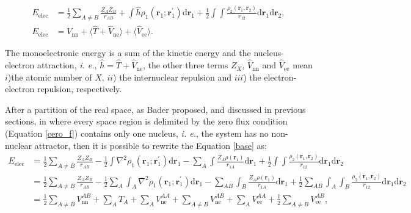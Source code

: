 \begin{align}
  E_{\mathrm{elec}} & = \frac{1}{2} \sum_{A \neq B} \frac{Z_A Z_B}{r_{AB}} 
    + \int \widehat{h} \rho_1(\mathbf{r}_1;\mathbf{r}_1^{\prime}) \mathrm{d} \mathbf{r}_1 
    + \frac{1}{2} \int \int \frac{\rho_2(\mathbf{r}_1,\mathbf{r}_2)}{r_{12}} 
    \mathrm{d} \mathbf{r}_1 \mathrm{d} \mathbf{r}_2, \label{base}\\
  E_{\mathrm{elec}} & = V_{\mathrm{nn}}
    + \langle \widehat{T} + \widehat{V}_{\mathrm{ne}} \rangle 
    + \langle \widehat{V}_{\mathrm{ee}} \rangle.
\end{align}

The monoelectronic energy is a sum of the kinetic energy and the
nucleus-electron attraction, \textit{i. e.}, $\widehat{h} = \widehat{T} +
\widehat{V}_{\mathrm{ne}}$, the other three terms $Z_X$,
$\widehat{V}_{\mathrm{nn}}$ and $\widehat{V}_{\mathrm{ee}}$ mean $i$)the atomic
number of $X$, $ii$) the internuclear repulsion and $iii$) the
electron-electron repulsion, respectively.

After a partition of the real space, as Bader proposed, and discussed in
previous sections, in where every space region is delimited by the zero flux
condition (Equation \ref{cero_f}) contains only one nucleus, \textit{i. e.},
the system has no non-nuclear attractor, then it is possible to rewrite the
Equation \ref{base} as:
%
\footnotesize
\begin{align} 
  E_{\mathrm{elec}}  &=  \frac{1}{2} \sum_{A \neq B} \frac{Z_A Z_B}{r_{AB}} 
    -\frac{1}{2} \int \nabla^2 \rho_1(\mathbf{r}_1;
    \mathbf{r}_1^{\prime}) \mathrm{d} \mathbf{r}_1
    -\sum_A  \int \frac{Z_A \rho(\mathbf{r}_1)}{r_{1A}} \mathrm{d} \mathbf{r}_1 
    +\frac{1}{2} \int \int \frac{\rho_2(\mathbf{r}_1,
    \mathbf{r}_2)}{r_{12}} \mathrm{d} \mathbf{r}_1
    \mathrm{d} \mathbf{r}_2 \nonumber \\
  &=  \frac{1}{2} \sum_{A \neq B} \frac{Z_A Z_B}{r_{AB}} 
    -\frac{1}{2} \sum_A  \int_A   \nabla^2 \rho_1(\mathbf{r}_1;
    \mathbf{r}_1^{\prime}) \mathrm{d} \mathbf{r}_1  
    -\sum_{AB} \int_B \frac{Z_A \rho(\mathbf{r}_1)}{r_{1A}} \mathrm{d} \mathbf{r}_1
    +\frac{1}{2} \sum_{AB} \int_A \int_B \frac{\rho_2(\mathbf{r}_1,
    \mathbf{r}_2)}{r_{12}} \mathrm{d} \mathbf{r}_1 \mathrm{d} \mathbf{r}_2 \nonumber \\
  &=  \frac{1}{2} \sum_{A \neq B} V_{\mathrm{nn}}^{AB}
    +\sum_A T_A + \sum_A V_{\mathrm{ne}}^{AA}
    +\sum_{A \neq B} V_{\mathrm{ne}}^{AB} + \sum_A V_{\mathrm{ee}}^{AA} 
    +\frac{1}{2} \sum_{A \neq B} V_{\mathrm{ee}}^{AB},
\end{align}
\normalsize

